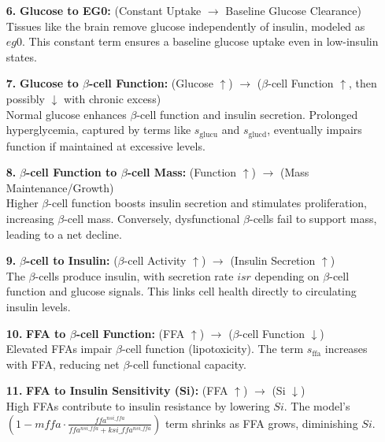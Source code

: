 \begin{itemize}
    \item[\textbf{6.}] \textbf{Glucose to EG0:} (Constant Uptake $\rightarrow$ Baseline Glucose Clearance) \\
    Tissues like the brain remove glucose independently of insulin, modeled as $eg0$. This constant term ensures a baseline glucose uptake even in low-insulin states.
    
    \item[\textbf{7.}] \textbf{Glucose to $\beta$-cell Function:} (Glucose $\uparrow$) $\rightarrow$ ($\beta$-cell Function $\uparrow$, then possibly $\downarrow$ with chronic excess) \\
    Normal glucose enhances $\beta$-cell function and insulin secretion. Prolonged hyperglycemia, captured by terms like $s_{\text{glucu}}$ and $s_{\text{glucd}}$, eventually impairs function if maintained at excessive levels.
    
    \item[\textbf{8.}] \textbf{$\beta$-cell Function to $\beta$-cell Mass:} (Function $\uparrow$) $\rightarrow$ (Mass Maintenance/Growth) \\
    Higher $\beta$-cell function boosts insulin secretion and stimulates proliferation, increasing $\beta$-cell mass. Conversely, dysfunctional $\beta$-cells fail to support mass, leading to a net decline.
    
    \item[\textbf{9.}] \textbf{$\beta$-cell to Insulin:} ($\beta$-cell Activity $\uparrow$) $\rightarrow$ (Insulin Secretion $\uparrow$) \\
    The $\beta$-cells produce insulin, with secretion rate $isr$ depending on $\beta$-cell function and glucose signals. This links cell health directly to circulating insulin levels.
    
    \item[\textbf{10.}] \textbf{FFA to $\beta$-cell Function:} (FFA $\uparrow$) $\rightarrow$ ($\beta$-cell Function $\downarrow$) \\
    Elevated FFAs impair $\beta$-cell function (lipotoxicity). The term $s_{\text{ffa}}$ increases with FFA, reducing net $\beta$-cell functional capacity.
    
    \item[\textbf{11.}] \textbf{FFA to Insulin Sensitivity (Si):} (FFA $\uparrow$) $\rightarrow$ (Si $\downarrow$) \\
    High FFAs contribute to insulin resistance by lowering $Si$. The model's $(1 - mffa \cdot \frac{ffa^{nsi\_ffa}}{ffa^{nsi\_ffa} + ksi\_ffa^{nsi\_ffa}})$ term shrinks as FFA grows, diminishing $Si$.
    

\end{itemize}
